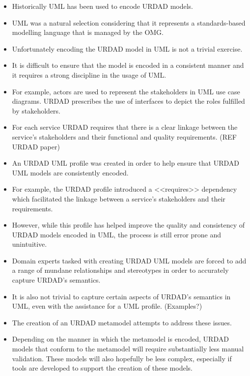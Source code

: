 \begin{itemize}
\begin{itemize}
		\item	Historically UML has been used to encode URDAD models. 
		\item	UML was a natural selection considering that it represents a standards-based modelling language that is managed by the OMG.
		\item	Unfortunately encoding the URDAD model in UML is not a trivial exercise.
		\item	It is difficult to ensure that the model is encoded in a consistent manner and it requires a strong discipline in the usage of UML.
		\item For example, actors are used to represent the stakeholders in UML use case diagrams. URDAD prescribes the use of interfaces to depict the roles fulfilled by stakeholders.
		\item For each service URDAD requires that there is a clear linkage between the service's stakeholders and their functional and quality requirements. (REF URDAD paper)
		\item An URDAD UML profile was created in order to help ensure that URDAD UML models are consistently encoded.
		\item For example, the URDAD profile introduced a <<requires>> dependency which facilitated the linkage between a service's stakeholders and their requirements.
		\item However, while this profile has helped improve the quality and consistency of URDAD models encoded in UML, the process is still error prone and unintuitive.
		\item Domain experts tasked with creating URDAD UML models are forced to add a range of mundane relationships and stereotypes in order to accurately capture URDAD's semantics. 
		\item It is also not trivial to capture certain aspects of URDAD's semantics in UML, even with the assistance for a UML profile. (Examples?)
		\item The creation of an URDAD metamodel attempts to address these issues.
		\item Depending on the manner in which the metamodel is encoded, URDAD models that conform to the metamodel will require substantially less manual validation. These models will also hopefully be less complex, especially if tools are developed to support the creation of these models.
	\end{itemize}


\end{itemize}
